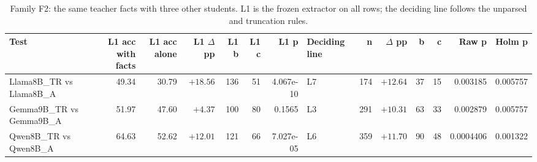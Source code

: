\begin{table}[t]
\centering
\small
\caption{Family F2: the same teacher facts with three other students. L1 is the frozen extractor on all rows; the deciding line follows the unparsed and truncation rules.}
\label{tab:d13-transfer}
\begin{tabular}{lrrrrrrlrrrrrr}
\toprule
Test & L1 acc with facts & L1 acc alone & L1 $\Delta$ pp & L1 b & L1 c & L1 p & Deciding line & n & $\Delta$ pp & b & c & Raw p & Holm p \\
\midrule
Llama8B\_TR vs Llama8B\_A & 49.34 & 30.79 & $+18.56$ & 136 & 51 & 4.067e-10 & L7 & 174 & $+12.64$ & 37 & 15 & 0.003185 & 0.005757 \\
Gemma9B\_TR vs Gemma9B\_A & 51.97 & 47.60 & $+4.37$ & 100 & 80 & 0.1565 & L3 & 291 & $+10.31$ & 63 & 33 & 0.002879 & 0.005757 \\
Qwen8B\_TR vs Qwen8B\_A & 64.63 & 52.62 & $+12.01$ & 121 & 66 & 7.027e-05 & L6 & 359 & $+11.70$ & 90 & 48 & 0.0004406 & 0.001322 \\
\bottomrule
\end{tabular}
\end{table}
